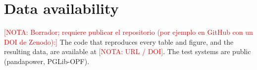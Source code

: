 \documentclass[preprint,12pt]{elsarticle}
\newcommand{\nota}[1]{\textcolor{red}{[NOTA: #1]}}
\begin{document}
\section*{Data availability}
\nota{Borrador; requiere publicar el repositorio (por ejemplo en GitHub con un DOI de Zenodo):}
The code that reproduces every table and figure, and the resulting data, are available at \nota{URL / DOI}. The test
systems are public (pandapower, PGLib-OPF).



\end{document}
